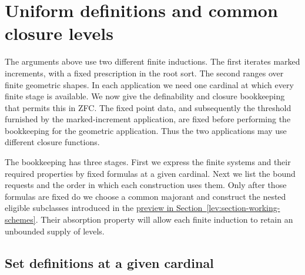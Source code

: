 \section{Uniform definitions and common closure levels}
\label{close:section-uniform}

The arguments above use two different finite inductions.  The first
iterates marked increments, with a fixed prescription in the root sort.
The second ranges over finite geometric shapes.  In each application we
need one cardinal at which every finite stage is available.  We now give
the definability and closure bookkeeping that permits this in ZFC.
The fixed point data, and subsequently the threshold furnished by the
marked-increment application, are fixed before performing the bookkeeping
for the geometric application.  Thus the two applications may use different
closure functions.

The bookkeeping has three stages.  First we express the finite systems
and their required properties by fixed formulas at a given cardinal.
Next we list the bound requests and the order in which each construction
uses them.  Only after those formulas are fixed do we choose a common
majorant and construct the nested eligible subclasses introduced in the
\hyperref[lev:closure-preview]{preview in Section~\ref*{lev:section-working-schemes}}.
Their absorption property will allow
each finite induction to retain an unbounded supply of levels.

\subsection{Set definitions at a given cardinal}

